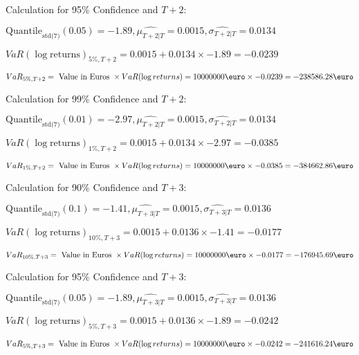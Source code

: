 Calculation for 95\% Confidence and $T+2$:

\indent\indent $\text{Quantile}_\text{std(7)}(0.05) = -1.89,\hat{\mu_{T+2|T}} = 0.0015, \hat{\sigma_{T+2|T}} = 0.0134$

\indent\indent $VaR(\log \text{returns})_{5\%, T + 2} = 0.0015 + 0.0134\times-1.89 = -0.0239$

\indent\indent $VaR_{5\%, T + 2} = \text{ Value in Euros } \times VaR(\log returns) = 10 000 000 \text{\euro} \times-0.0239 = -238586.28 \text{\euro}$\newline




Calculation for 99\% Confidence and $T+2$:

\indent\indent $\text{Quantile}_\text{std(7)}(0.01) = -2.97,\hat{\mu_{T+2|T}} = 0.0015, \hat{\sigma_{T+2|T}} = 0.0134$

\indent\indent $VaR(\log \text{returns})_{1\%, T + 2} = 0.0015 + 0.0134\times-2.97 = -0.0385$

\indent\indent $VaR_{1\%, T + 2} = \text{ Value in Euros } \times VaR(\log returns) = 10 000 000 \text{\euro} \times-0.0385 = -384662.86 \text{\euro}$\newline




Calculation for 90\% Confidence and $T+3$:

\indent\indent $\text{Quantile}_\text{std(7)}(0.1) = -1.41,\hat{\mu_{T+3|T}} = 0.0015, \hat{\sigma_{T+3|T}} = 0.0136$

\indent\indent $VaR(\log \text{returns})_{10\%, T + 3} = 0.0015 + 0.0136\times-1.41 = -0.0177$

\indent\indent $VaR_{10\%, T + 3} = \text{ Value in Euros } \times VaR(\log returns) = 10 000 000 \text{\euro} \times-0.0177 = -176945.69 \text{\euro}$\newline




Calculation for 95\% Confidence and $T+3$:

\indent\indent $\text{Quantile}_\text{std(7)}(0.05) = -1.89,\hat{\mu_{T+3|T}} = 0.0015, \hat{\sigma_{T+3|T}} = 0.0136$

\indent\indent $VaR(\log \text{returns})_{5\%, T + 3} = 0.0015 + 0.0136\times-1.89 = -0.0242$

\indent\indent $VaR_{5\%, T + 3} = \text{ Value in Euros } \times VaR(\log returns) = 10 000 000 \text{\euro} \times-0.0242 = -241616.24 \text{\euro}$\newline




